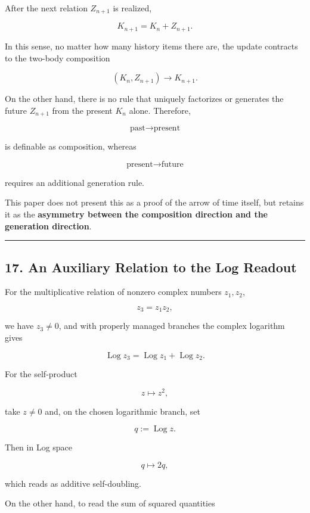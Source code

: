 \documentclass[
  a4paper,
]{article}
\begin{document}
After the next relation \(Z_{n+1}\) is realized,

\[
K_{n+1}=K_n+Z_{n+1}.
\]

In this sense, no matter how many history items there are, the update
contracts to the two-body composition

\[
\boxed{(K_n,Z_{n+1})\to K_{n+1}}.
\]

On the other hand, there is no rule that uniquely factorizes or
generates the future \(Z_{n+1}\) from the present \(K_n\) alone.
Therefore,

\[
\boxed{\text{past}\to\text{present}}
\]

is definable as composition, whereas

\[
\boxed{\text{present}\to\text{future}}
\]

requires an additional generation rule.

This paper does not present this as a proof of the arrow of time itself,
but retains it as the \textbf{asymmetry between the composition
direction and the generation direction}.

\begin{center}\rule{0.5\linewidth}{0.5pt}\end{center}

\subsection{17. An Auxiliary Relation to the Log
Readout}\label{an-auxiliary-relation-to-the-log-readout}

For the multiplicative relation of nonzero complex numbers \(z_1,z_2\),

\[
z_3=z_1z_2,
\]

we have \(z_3\neq0\), and with properly managed branches the complex
logarithm gives

\[
\operatorname{Log} z_3=\operatorname{Log} z_1+\operatorname{Log} z_2.
\]

For the self-product

\[
z\mapsto z^2,
\]

take \(z\neq0\) and, on the chosen logarithmic branch, set

\[
q:=\operatorname{Log}z.
\]

Then in Log space

\[
q\mapsto 2q,
\]

which reads as additive self-doubling.

On the other hand, to read the sum of squared quantities
\end{document}
